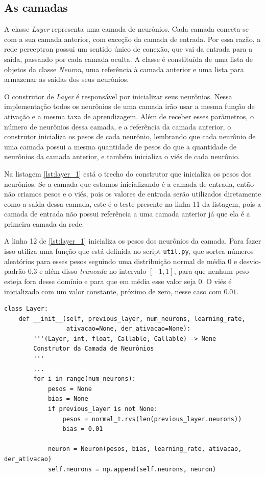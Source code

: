 \subsection{As camadas}

A classe \emph{Layer} representa uma camada de neurônios. Cada camada conecta-se com a sua camada anterior, com exceção da camada de entrada. Por essa razão, a rede perceptron possui um sentido único de conexão, que vai da entrada para a saída, passando por cada camada oculta. A classe é constituída de uma lista de objetos da classe \emph{Neuron}, uma referência à camada anterior e uma lista para armazenar as saídas dos seus neurônios.

O construtor de \emph{Layer} é responsável por inicializar seus neurônios. Nessa implementação todos os neurônios de uma camada irão usar a mesma função de ativação e a mesma taxa de aprendizagem. Além de receber esses parâmetros, o número de neurônios dessa camada, e a referência da camada anterior, o construtor inicializa os pesos de cada neurônio, lembrando que cada neurônio de uma camada possui a mesma quantidade de pesos do que a quantidade de neurônios da camada anterior, e também inicializa o viés de cada neurônio. 

Na listagem \ref{lst:layer_1} está o trecho do construtor que inicializa os pesos dos neurônios. Se a camada que estamos inicializando é a camada de entrada, então não criamos pesos e o viés, pois os valores de entrada serão utilizados diretamente como a saída dessa camada, este é o teste presente na linha 11 da listagem, pois a camada de entrada não possui referência a uma camada anterior já que ela é a primeira camada da rede.

A linha 12 de \ref{lst:layer_1} inicializa os pesos dos neurônios da camada. Para fazer isso utiliza uma função que está definida no script \texttt{util.py}, que sortea números aleatórios para esses pesos seguindo uma distribuição normal de média $0$ e desvio-padrão $0.3$ e além disso \emph{truncada} no intervalo $[-1, 1]$, para que nenhum peso esteja fora desse domínio e para que em média esse valor seja $0$. O viés é inicializado com um valor constante, próximo de zero, nesse caso com $0.01$.

\begin{scriptsize}
\estiloR
\begin{lstlisting}[caption={Trecho da classe \eng{Layer}}, label={lst:layer_1}, escapeinside={\%}]
class Layer:
    def __init__(self, previous_layer, num_neurons, learning_rate,
                 ativacao=None, der_ativacao=None):
        '''(Layer, int, float, Callable, Callable) -> None
        Construtor da Camada de Neurônios
        '''
        ...
        for i in range(num_neurons):
            pesos = None
            bias = None
            if previous_layer is not None:
                pesos = normal_t.rvs(len(previous_layer.neurons))
                bias = 0.01
            
            neuron = Neuron(pesos, bias, learning_rate, ativacao, der_ativacao)
            self.neurons = np.append(self.neurons, neuron)
\end{lstlisting}
\end{scriptsize}

